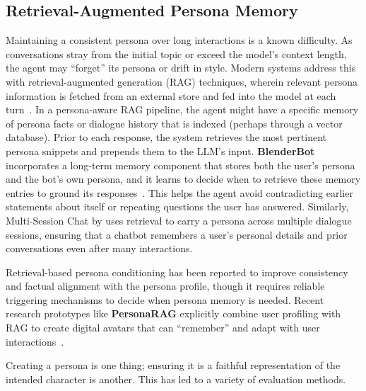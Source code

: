 \subsection{Retrieval-Augmented Persona Memory}
Maintaining a consistent persona over long interactions is a known difficulty. As conversations stray from the initial topic or exceed the model's context length, the agent may ``forget'' its persona or drift in style. Modern systems address this with retrieval-augmented generation (RAG) techniques, wherein relevant persona information is fetched from an external store and fed into the model at each turn~\cite{shuster2022blenderbot3deployedconversational,xu-etal-2022-beyond}. In a persona-aware RAG pipeline, the agent might have a specific memory of persona facts or dialogue history that is indexed (perhaps through a vector database). Prior to each response, the system retrieves the most pertinent persona snippets and prepends them to the LLM's input. \textbf{BlenderBot}~\cite{shuster2022blenderbot3deployedconversational} incorporates a long-term memory component that stores both the user's persona and the bot's own persona, and it learns to decide when to retrieve these memory entries to ground its responses~\cite{shuster2022blenderbot3deployedconversational}. This helps the agent avoid contradicting earlier statements about itself or repeating questions the user has answered. Similarly, Multi-Session Chat by \citet{xu-etal-2022-beyond} uses retrieval to carry a persona across multiple dialogue sessions, ensuring that a chatbot remembers a user's personal details and prior conversations even after many interactions.

Retrieval-based persona conditioning has been reported to improve consistency and factual alignment with the persona profile, though it requires reliable triggering mechanisms to decide when persona memory is needed. Recent research prototypes like \textbf{PersonaRAG} explicitly combine user profiling with RAG to create digital avatars that can ``remember'' and adapt with user interactions~\cite{kimara2025personaaileveragingretrievalaugmentedgeneration}.

Creating a persona is one thing; ensuring it is a faithful representation of the intended character is another. This has led to a variety of evaluation methods.

